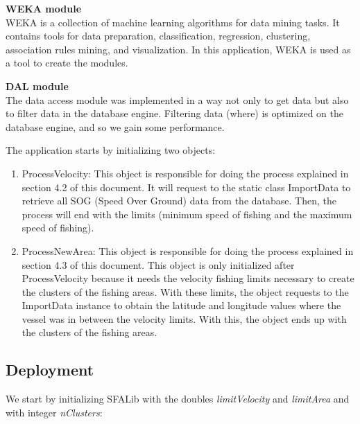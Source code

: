 \textbf{WEKA module} \\WEKA is a collection of machine learning algorithms for data mining tasks. It contains tools for data preparation, classification, regression, clustering, association rules mining, and visualization. In this application, WEKA is used as a tool to create the modules.

\textbf{DAL module} \\The data access module was implemented in a way not only to get data but also to filter data in the database engine. Filtering data (where) is optimized on the database engine, and so we gain some performance.




The application starts by initializing two objects:
\begin{enumerate}
\item ProcessVelocity: This object is responsible for doing the process explained in section 4.2 of this document. It will request to the static class ImportData to retrieve all SOG (Speed Over Ground) data from the database. Then, the process will end with the limits (minimum speed of fishing and the maximum speed of fishing).
\item ProcessNewArea: This object is responsible for doing the process explained in section 4.3 of this document. This object is only initialized after ProcessVelocity because it needs the velocity fishing limits necessary to create the clusters of the fishing areas. With these limits, the object requests to the ImportData instance to obtain the latitude and longitude values where the vessel was in between the velocity limits. With this, the object ends up with the clusters of the fishing areas.
\end{enumerate}



\subsection{Deployment} %
\label{sub:deployment}

We start by initializing SFALib with the doubles \emph{limitVelocity} and \emph{limitArea} and with integer \emph{nClusters}:

